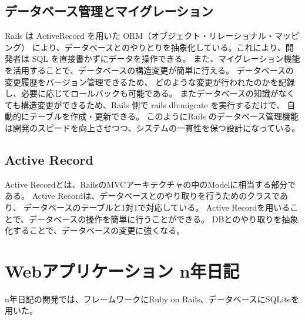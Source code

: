 \documentclass[dvipdfmx,fleqn,article]{jlreq}
\begin{document}
\subsection{データベース管理とマイグレーション}
Rails は ActiveRecord を用いた ORM（オブジェクト・リレーショナル・マッピング） により、データベースとのやりとりを抽象化している。これにより、開発者は SQL を直接書かずにデータを操作できる。 また、マイグレーション機能を活用することで、データベースの構造変更が簡単に行える。
データベースの変更履歴をバージョン管理できるため、
どのような変更が行われたのかを記録し、必要に応じてロールバックも可能である。
またデータベースの知識がなくても構造変更ができるため、Rails 側で rails db:migrate を実行するだけで、
自動的にテーブルを作成・更新できる。
このようにRails のデータベース管理機能は開発のスピードを向上させつつ、システムの一貫性を保つ設計になっている。

\subsection{Active Record}
Active Recordとは、RailsのMVCアーキテクチャの中のModelに相当する部分である。
Active Recordは、データベースとのやり取りを行うためのクラスであり、
データベースのテーブルと1対1で対応している。
Active Recordを用いることで、データベースの操作を簡単に行うことができる。
DBとのやり取りを抽象化することで、データベースの変更に強くなる。


\section{Webアプリケーション n年日記}
n年日記の開発では、フレームワークにRuby on Rails、データベースにSQLiteを用いた。
\end{document}
